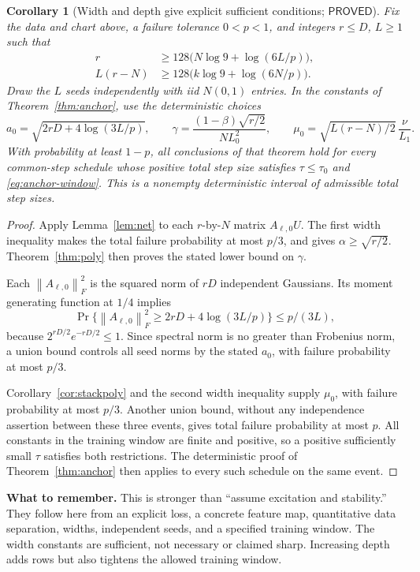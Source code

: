 \documentclass[12pt,a4paper]{article}
\theoremstyle{readable}
\newtheorem{corollary}[theorem]{Corollary}
\theoremstyle{definition}\newtheorem{example}[theorem]{Example}
\newcommand{\norm}[1]{\left\|#1\right\|}
\newcommand{\PP}{\mathsf{PROVED}}\newcommand{\FF}{\mathsf{FALSE}}
\newcommand{\takeaway}[1]{\par\textbf{What to remember.} #1\par}
\begin{document}
\begin{corollary}[Width and depth give explicit sufficient conditions; \(\PP\)]\label{cor:uniform}
Fix the data and chart above, a failure tolerance \(0<p<1\), and integers \(r\le D\), \(L\ge1\) such that
\begin{align*}
r&\ge128\bigl(N\log9+\log(6L/p)\bigr),\\
L(r-N)&\ge128\bigl(k\log9+\log(6N/p)\bigr).
\end{align*}
Draw the \(L\) seeds independently with iid \(N(0,1)\) entries. In the constants of Theorem~\ref{thm:anchor}, use the deterministic choices
\[
a_0=\sqrt{2rD+4\log(3L/p)},\qquad
\gamma=\frac{(1-\beta)\sqrt{r/2}}{N L_0^2},\qquad
\mu_0=\sqrt{L(r-N)/2}\,\frac{\nu}{L_1}.
\]
With probability at least \(1-p\), all conclusions of that theorem hold for every common-step schedule whose positive total step size satisfies \(\tau\le\tau_0\) and \eqref{eq:anchor-window}. This is a nonempty deterministic interval of admissible total step sizes.
\end{corollary}
\begin{proof}
Apply Lemma~\ref{lem:net} to each \(r\)-by-\(N\) matrix \(A_{\ell,0}U\). The first width inequality makes the total failure probability at most \(p/3\), and gives \(\alpha\ge\sqrt{r/2}\). Theorem~\ref{thm:poly} then proves the stated lower bound on \(\gamma\).

Each \(\norm{A_{\ell,0}}_F^2\) is the squared norm of \(rD\) independent Gaussians. Its moment generating function at \(1/4\) implies
\[
\Pr\{\norm{A_{\ell,0}}_F^2\ge2rD+4\log(3L/p)\}
\le p/(3L),
\]
because \(2^{rD/2}e^{-rD/2}\le1\). Since spectral norm is no greater than Frobenius norm, a union bound controls all seed norms by the stated \(a_0\), with failure probability at most \(p/3\).

Corollary~\ref{cor:stackpoly} and the second width inequality supply \(\mu_0\), with failure probability at most \(p/3\). Another union bound, without any independence assertion between these three events, gives total failure probability at most \(p\). All constants in the training window are finite and positive, so a positive sufficiently small \(\tau\) satisfies both restrictions. The deterministic proof of Theorem~\ref{thm:anchor} then applies to every such schedule on the same event.
\end{proof}
\takeaway{This is stronger than ``assume excitation and stability.'' They follow here from an explicit loss, a concrete feature map, quantitative data separation, widths, independent seeds, and a specified training window. The width constants are sufficient, not necessary or claimed sharp. Increasing depth adds rows but also tightens the allowed training window.}
\end{document}

